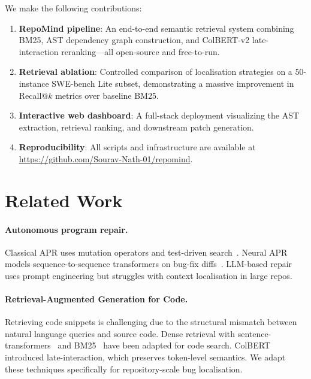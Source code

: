 \documentclass[11pt]{article}
\begin{document}
We make the following contributions:
\begin{enumerate}
  \item \textbf{RepoMind pipeline}: An end-to-end semantic retrieval system
        combining BM25, AST dependency graph construction, and ColBERT-v2
        late-interaction reranking---all open-source and free-to-run.
  \item \textbf{Retrieval ablation}: Controlled comparison of localisation
        strategies on a 50-instance SWE-bench Lite subset, demonstrating a
        massive improvement in Recall@$k$ metrics over baseline BM25.
  \item \textbf{Interactive web dashboard}: A full-stack deployment
        visualizing the AST extraction, retrieval ranking, and downstream
        patch generation.
  \item \textbf{Reproducibility}: All scripts and infrastructure are
        available at \url{https://github.com/Sourav-Nath-01/repomind}.
\end{enumerate}

\section{Related Work}

\paragraph{Autonomous program repair.}
Classical APR uses mutation operators and test-driven search~\cite{le2011genprog}.
Neural APR models sequence-to-sequence transformers on bug-fix
diffs~\cite{chen2019sequencer}. LLM-based repair~\cite{fan2023automated}
uses prompt engineering but struggles with context localisation in large repos.

\paragraph{Retrieval-Augmented Generation for Code.}
Retrieving code snippets is challenging due to the structural mismatch between
natural language queries and source code. Dense retrieval with
sentence-transformers~\cite{reimers2019sentence} and BM25~\cite{robertson2009probabilistic}
have been adapted for code search. ColBERT~\cite{khattab2020colbert} introduced
late-interaction, which preserves token-level semantics. We adapt these
techniques specifically for repository-scale bug localisation.
\end{document}
